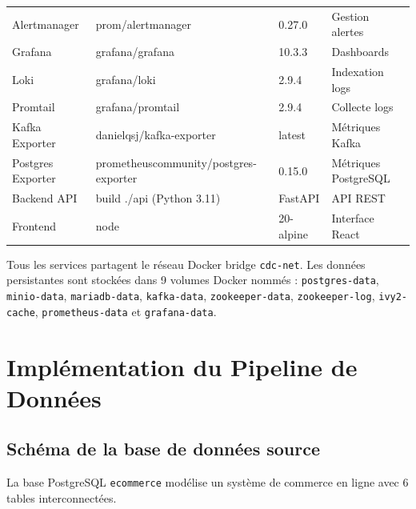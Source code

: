 \documentclass[12pt,a4paper]{report}
\begin{document}
\begin{longtable}{llll}
Alertmanager    & prom/alertmanager                       & 0.27.0   & Gestion alertes        \\
Grafana         & grafana/grafana                         & 10.3.3   & Dashboards             \\
Loki            & grafana/loki                            & 2.9.4    & Indexation logs        \\
Promtail        & grafana/promtail                        & 2.9.4    & Collecte logs          \\
Kafka Exporter  & danielqsj/kafka-exporter                & latest   & Métriques Kafka        \\
Postgres Exporter & prometheuscommunity/postgres-exporter & 0.15.0   & Métriques PostgreSQL   \\
Backend API     & build ./api (Python 3.11)               & FastAPI  & API REST               \\
Frontend        & node                                    & 20-alpine & Interface React       \\
\end{longtable}

Tous les services partagent le réseau Docker bridge \texttt{cdc-net}.
Les données persistantes sont stockées dans 9 volumes Docker nommés :
\texttt{postgres-data}, \texttt{minio-data}, \texttt{mariadb-data},
\texttt{kafka-data}, \texttt{zookeeper-data}, \texttt{zookeeper-log},
\texttt{ivy2-cache}, \texttt{prometheus-data} et \texttt{grafana-data}.

\chapter{Implémentation du Pipeline de Données}

\section{Schéma de la base de données source}

La base PostgreSQL \texttt{ecommerce} modélise un système de commerce en
ligne avec 6 tables interconnectées.
\end{document}
